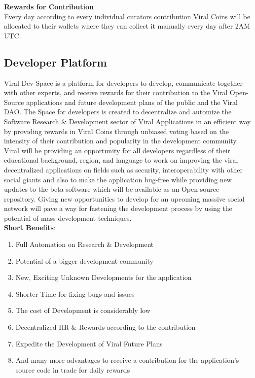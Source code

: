 \documentclass[10pt]{article}
\begin{document}
\textbf{Rewards for Contribution}\\

Every day according to every individual curators contribution Viral Coins will be allocated to their wallets where they can collect it manually every day after 2AM UTC. 


\subsection{Developer Platform}

Viral Dev-Space is a platform for developers to develop, communicate together with other experts, and receive rewards for their contribution to the Viral Open-Source applications and future development plans of the public and the Viral DAO. The Space for developers is created to decentralize and automize the Software Research \& Development sector of Viral Applications in an efficient way by providing rewards in Viral Coins through unbiased voting based on the intensity of their contribution and popularity in the development community.\\

Viral will be providing an opportunity for all developers regardless of their educational background, region, and language to work on improving the viral decentralized applications on fields such as security, interoperability with other social giants and also to make the application bug-free while providing new updates to the beta software which will be available as an Open-source repository. Giving new opportunities to develop for an upcoming massive social network will pave a way for fastening the development process by using the potential of mass development techniques.\\


\textbf{Short Benefits}:
\begin{enumerate}[leftmargin=+0.2in]
\item Full Automation on Research \& Development
\item Potential of a bigger development community
\item New, Exciting Unknown Developments for the application
\item Shorter Time for fixing bugs and issues
\item The cost of Development is considerably low
\item Decentralized HR \& Rewards according to the contribution
\item Expedite the Development of Viral Future Plans
\item And many more advantages to receive a contribution for the application’s source code in trade for daily rewards
\end{enumerate}
\end{document}
